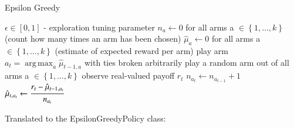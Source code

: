 \documentclass[nojss]{jss}\usepackage[]{graphicx}\usepackage[]{color}
\DeclareMathOperator*{\argmax}{arg\,max}
\begin{document}
\begin{algorithm}
\caption{Epsilon Greedy}
\label{Alg:EpsilonGreedy}
\begin{algorithmic}
\REQUIRE \(    \epsilon  \in \left[ 0,1 \right] \) - exploration tuning parameter
\STATE \( n_{a} \leftarrow 0 \) for all arms a \(  \in \left\{ 1, \dots, k \right\} \)  (count how many times an arm has been chosen)
\STATE \( \hat{\mu}_{a} \leftarrow 0 \) for all arms a  \(   \in \left\{ 1, \dots, k \right\} \)  (estimate of expected reward per arm)
		\STATE play arm \(a_t = \argmax_a  \hat{\mu}_{t-1,a}  \) with ties broken arbitrarily
	\ELSE
		\STATE play a random arm out of all arms a \(  \in \left\{ 1, \dots, k \right\} \)
	\ENDIF
	\STATE observe real-valued payoff $r_t$
	\STATE \( n_{a_{t}} \leftarrow n_{a_{t-1}} + 1  \)
   \STATE \( \hat{\mu}_{t,a_{t}} \leftarrow   \cfrac{r_t - \hat{\mu}_{t-1,a_{t}} }{n_{a_{t}}}   \)
\ENDFOR
\end{algorithmic}
\end{algorithm}

Translated to the EpsilonGreedyPolicy class:
\end{document}
